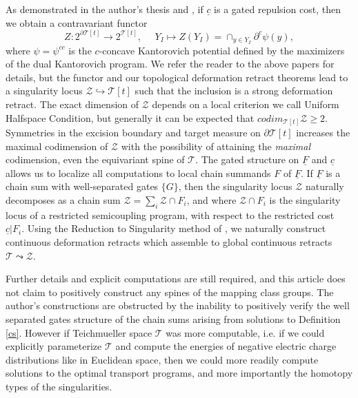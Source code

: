 \documentclass[12pt]{amsart}
\theoremstyle{definition}
\theoremstyle{remark}
\newcommand{\del}{\partial}
\newcommand{\uF}{\underline{F}}
\newcommand{\sT}{\mathscr{T}}
\newcommand{\sZ}{\mathscr{Z}}
\begin{document}
As demonstrated in the author's thesis \cite{martel} and \cite{martel2022}, if $\underline{c}$ is a gated repulsion cost, then we obtain a contravariant functor $$Z: 2^{\del \sT[t]} \to 2^{\sT[t]}, ~~~~~~Y_I \mapsto Z(Y_I) =  \cap_{y\in Y_I} \del^c \psi(y), $$ where $\psi=\psi^{cc}$ is the $c$-concave Kantorovich potential defined by the maximizers of the dual Kantorovich program. We refer the reader to the above papers for details, but the functor and our topological deformation retract theorems lead to a singularity locus $\sZ \hookrightarrow \sT[t]$ such that the inclusion is a strong deformation retract. The exact dimension of $\sZ$ depends on a local criterion we call Uniform Halfspace Condition, but generally it can be expected that $codim_{\sT[t]} \sZ\geq 2$. Symmetries in the excision boundary and target measure on $\del \sT[t]$ increases the maximal codimension of $\sZ$ with the possibility of attaining the \emph{maximal} codimension, even the equivariant spine of $\sT$. The gated structure on $\uF$ and $\underline{c}$ allows us to localize all computations to local chain summands $F$ of $\uF$. If $\uF$ is a chain sum with well-separated gates $\{G\}$, then the singularity locus $\sZ$ naturally decomposes as a chain sum $\sZ=\sum_i \sZ \cap F_i$, and where $\sZ \cap F_i$ is the singularity locus of a restricted semicoupling program, with respect to the restricted cost $\underline{c}|F_i$. Using the Reduction to Singularity method of \cite[Theorems 1.4.1-2]{martel}, we naturally construct continuous deformation retracts which assemble to global continuous retracts $\sT \leadsto \sZ$. 

Further details and explicit computations are still required, and this article does not claim to positively construct any spines of the mapping class groups. The author's constructions are obstructed by the inability to positively verify the well separated gates structure of the chain sums arising from solutions to Definition \ref{cs}. However if Teichmueller space $\sT$ was more computable, i.e. if we could explicitly parameterize $\sT$ and compute the energies of negative electric charge distributions like in Euclidean space, then we could more readily compute solutions to the optimal transport programs, and more importantly the homotopy types of the singularities. 


\end{document}
